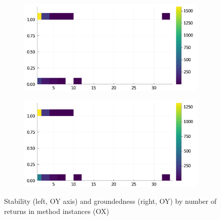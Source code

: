 \begin{figure}[h]
     \begin{subfigure}[b]{0.49\textwidth}
       \includegraphics[width=\textwidth]{figs/all-package-graphs/Pluto-returns-vs-stable.pdf}
     \end{subfigure}
     \begin{subfigure}[b]{0.49\textwidth}
       \includegraphics[width=\textwidth]{figs/all-package-graphs/Pluto-returns-vs-grounded.pdf}
     \end{subfigure}
\caption{Stability (left, OY axis) and groundedness (right, OY) by number of returns in method instances (OX)}%
%
\label{figs:returns:Pluto}
\end{figure}
\clearpage
